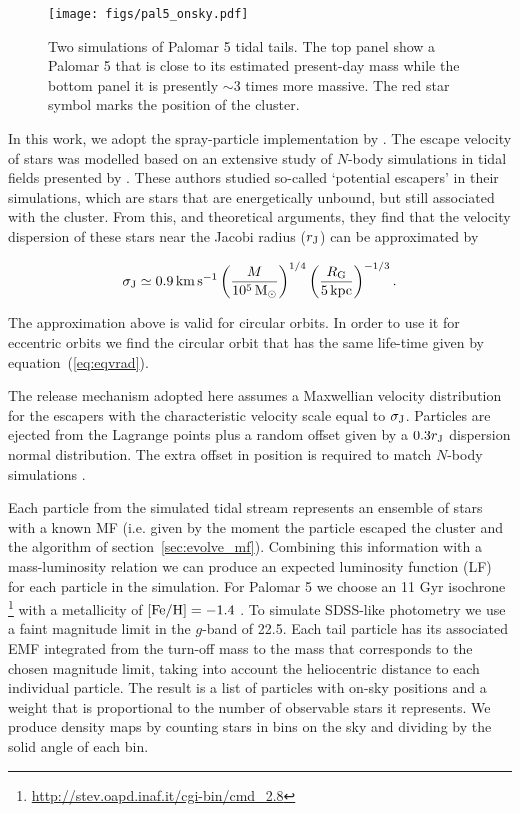 \documentclass[useAMS,usenatbib,fleqn]{mnras}
\newcommand{\rj}{r_{\rm J}}
\newcommand{\kpc}{{\rm kpc}}
\newcommand{\rg}{R_{\rm G}}
\newcommand{\feh}{\[Fe/H\]}
\newcommand{\msun}{{\rm M}_\odot}
\newcommand{\kms}{{\rm km}\,{\rm s}^{-1}}
\def\feh{{\rm [Fe/H]}}
\begin{document}
\begin{figure*}
\centering
\texttt{[image: figs/pal5\_onsky.pdf]}
    \caption{Two simulations of Palomar 5 tidal tails. The top panel show a
    Palomar 5 that is close to its estimated present-day mass
    \citep{Odenkirchen01} while the bottom panel it is presently $\sim 3$ times
    more massive. The red star symbol marks the position of the cluster.} 
\label{fig:p5onsky}
\end{figure*}

In this work, we adopt the spray-particle implementation by \citet{Kuepper12}.
The escape velocity of stars was modelled based on an extensive study of
$N$-body simulations in tidal fields presented by \citet*{Claydon16}.  These
authors studied so-called `potential escapers' in their simulations, which are
stars that are energetically unbound, but still associated with the cluster.
From this, and theoretical arguments, they find that the velocity dispersion of
these stars near the Jacobi radius ($\rj$) can be approximated by 

\begin{align}
\sigma_{\rm J} \simeq 0.9\,\kms\left(\frac{M}{10^5\,\msun}\right)^{1/4}\left(\frac{\rg}{5\,\kpc}\right)^{-1/3}.
\end{align}

The approximation above is valid for circular orbits. In order to use it for
eccentric orbits we find the circular orbit that has the same life-time given by
equation~(\ref{eq:eqvrad}).

The release mechanism adopted here assumes a Maxwellian velocity distribution
for the escapers with the characteristic velocity scale  equal to $\sigma_{\rm
J}$. Particles are ejected from the Lagrange points plus a random offset given
by a $0.3\rj$ dispersion normal distribution. The extra offset in position is
required to match $N$-body simulations \citep{Kuepper12, Lane12, Bonaca14,
Fardal15, Pearson15}.

Each particle from the simulated tidal stream represents an ensemble of stars
with a known MF (i.e. given by the moment the particle escaped the cluster and
the algorithm of section~\ref{sec:evolve_mf}). Combining this information with a
mass-luminosity relation we can produce an expected luminosity function (LF) for
each particle in the simulation.  For Palomar 5 we choose an 11 Gyr isochrone
\citep{Bressan12} \footnote{\url{http://stev.oapd.inaf.it/cgi-bin/cmd_2.8}} with
a metallicity of $\feh= -1.4$ \citep{Koch04}.  To simulate SDSS-like photometry
we use a faint magnitude limit in the $g$-band of 22.5. Each tail particle has
its associated EMF integrated from the turn-off mass to the mass that
corresponds to the chosen magnitude limit, taking into account the heliocentric
distance to each individual particle. The result is a list of particles with
on-sky positions and a weight that is proportional to the number of observable
stars it represents.  We produce density maps by counting stars in bins on the
sky and dividing by the solid angle of each bin.
\end{document}
